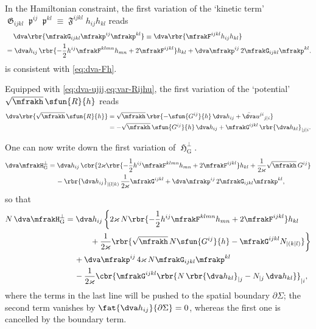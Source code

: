 \documentclass[a4paper,11pt]{article}
\begin{document}
In the Hamiltonian constraint, the first variation of the `kinetic term'
$\mfrakG_{ijkl}\mfrakp^{ij}\mfrakp^{kl} \equiv
\mfrakF^{ijkl}h_{ij}h_{kl}$ reads
\begin{align}
&\quad\,\dva\rbr{ \mfrakG_{ijkl} \mfrakp^{ij}\mfrakp^{kl}}
\equiv \dva\rbr{\mfrakF^{ijkl}h_{ij}h_{kl}}
\\
&=\dva h_{ij}\,\rbr{-\frac{1}{2} h^{ij} \mfrakF^{klmn} h_{mn}
+ 2 \mfrakF^{ijkl} } h_{kl} 
+\dva \mfrakp^{ij}\,2 \mfrakG_{ijkl}\mfrakp^{kl}.
\label{eq:dva-Fhh}
\end{align}
 is consistent with \cref{eq:dva-Fh}.

Equipped with \cref{eq:dva-ujij,eq:var-Rijhu}, the first variation of the 
`potential' 
$\sqrt{\mfrakh}\,\sfun{R}{h}$ reads
\begin{align}
\dva\rbr{\sqrt{\mfrakh}\,\sfun{R}{h}} &= \sqrt{\mfrakh}\,
\rbr{-\sfun{G^{ij}}{h}\,\dva h_{ij} +
\bar{\dva}u^{ji}{}_{j|i}}
\\
&= -\sqrt{\mfrakh}\,\sfun{G^{ij}}{h}\,\dva h_{ij} +
\mfrakG^{ijkl}\,\rbr{\dva h_{kl}}_{|j|i}.
\label{eq:dva-pot-2}
\end{align}

One can now write down the first variation of $\mfrakH_\text{G}^\perp$.
\begin{align}
\dva \mfrakH_\text{G}^\perp &= 
\dva h_{ij}\,\cbr{2\varkappa \rbr{-\frac{1}{2} h^{ij} \mfrakF^{klmn} h_{mn} + 
2 \mfrakF^{ijkl}}h_{kl} + \frac{1}{2\varkappa} \sqrt{\mfrakh}\,G^{ij}}
\nonumber \\
&\quad\,
-\rbr{\dva h_{ij}}_{|(l|k)}\,\frac{1}{2\varkappa} \mfrakG^{ijkl}
+\dva \mfrakp^{ij}\,2\mfrakG_{ijkl}\mfrakp^{kl},
\end{align}
so that
\begin{align}
N\,\dva \mfrakH_\text{G}^\perp &= \dva h_{ij}\,\bigg\{
2\varkappa\,N\rbr{ -\frac{1}{2}h^{ij} \mfrakF^{klmn} h_{mn}
+ 2 \mfrakF^{ijkl}} h_{kl}
\nonumber \\
&\quad\,\qquad
+\frac{1}{2\varkappa}
\rbr{ \sqrt{\mfrakh}\,N\sfun{G^{ij}}{h}
-\mfrakG^{ijkl}N_{|(k|l)}}\bigg\}
\nonumber \\
&\quad\,
+\dva \mfrakp^{ij}\,4\varkappa\,N\mfrakG_{ijkl}\mfrakp^{kl}
\nonumber \\
&\quad\,
-\frac{1}{2\varkappa}
\cbr{\mfrakG^{ijkl}
\rbr{N\,\rbr{\dva h_{kl}}_{|j} - N_{|j}\,\dva h_{kl}} }_{|i},
\end{align}
where the terms in the last line will be pushed to the spatial boundary
$\partial\Sigma$; the second term vanishes by $\fat{\dva 
h_{ij}}{\partial\Sigma} 
= 0$, whereas the first one is cancelled by the boundary term.
\end{document}
